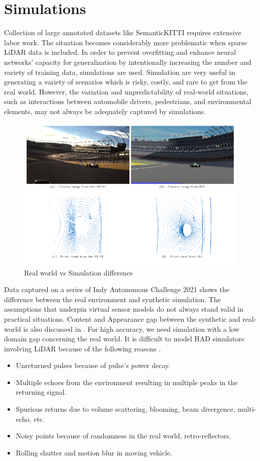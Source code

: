\section{Simulations}
Collection of large annotated datasets like SemanticKITTI requires extensive labor work\parencite{behley2019semantickitti}. The situation becomes considerably more problematic when sparse LiDAR data is included. In order to prevent overfitting and enhance neural networks' capacity for generalization by intentionally increasing the number and variety of training data, simulations are used. Simulation are very useful in generating a variety of scenarios which is risky, costly, and rare to get from the real world. However, the variation and unpredictability of real-world situations, such as interactions between automobile drivers, pedestrians, and environmental elements, may not always be adequately captured by simulations.
\begin{figure}[htbp]
    \centering
    \includegraphics[width=0.8\linewidth]{97_graphics/related_work/real_vs_simulation_difference.pdf}
    \caption{Real world vs Simulation difference \parencite{sauerbeck_learn_Year}}
    \label{fig:related_work-real_vs_simulation}
\end{figure}

Data captured on a series of Indy Autonomous Challenge 2021 \parencite{sauerbeck_learn_Year} shows the difference between the real environment and synthetic simulation. The assumptions that underpin virtual sensor models do not always stand valid in practical situations. Content and Appearance gap between the synthetic and real-world is also discussed in \parencite{care_real_and_syn_gap}. For high accuracy, we need simulation with a low domain gap concerning the real world. It is difficult to model HAD simulators involving LiDAR because of the following reasons \parencite{zero_domain_gap}. 
\begin{itemize}
    \item Unreturned pulses because of pulse's power decay.
    \item Multiple echoes from the environment resulting in multiple peaks in the returning signal.
    \item Spurious returns due to volume scattering, blooming, beam divergence, multi-echo, etc.
    \item Noisy points because of randomness in the real world, retro-reflectors.
    \item Rolling shutter and motion blur in moving vehicle.
\end{itemize}

